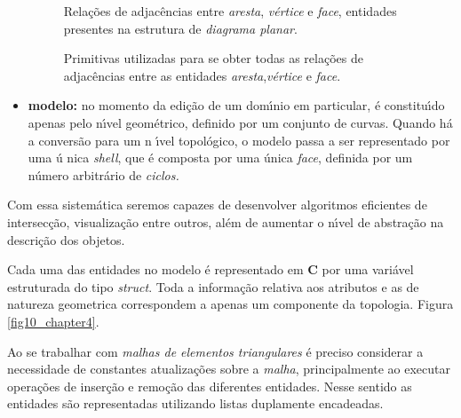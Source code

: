 \documentclass[12pt,a4paper]{book}
\begin{document}
\begin{itemize}
\begin{figure}[htbp]
  \begin{center}
    \leavevmode
    
    \caption{Rela\c{c}\~{o}es de adjac\^{e}ncias entre {\textit{aresta}}, {\textit{v\'{e}rtice}} e {\textit{face}},
	              entidades presentes na estrutura de {\textit{diagrama planar}}.  }   
    \label{fig8_chapter4}
  \end{center}
\end{figure}

\begin{figure}[htbp]
  \begin{center}
    \leavevmode
    
    \caption{Primitivas utilizadas para se obter todas as rela\c{c}\~{o}es de adjac\^{e}ncias
	              entre as entidades {\textit{aresta}},{\textit{v\'{e}rtice}} e {\textit{face}}.}   
    \label{fig9_chapter4}
  \end{center}
\end{figure}


\item \textbf{modelo:} no momento da edi\c{c}\~{a}o de um dom\'{\i}nio em
particular, \'{e} constitu\'{\i}do apenas pelo n\'{\i}vel geom\'{e}trico,
definido por um conjunto de curvas. Quando h\'{a} a convers\~{a}o para um n%
\'{\i}vel topol\'{o}gico, o modelo passa a ser representado por uma \'{u}%
nica \textit{shell}, que \'{e} composta por uma \'{u}nica \textit{face},
definida por um n\'{u}mero arbitr\'{a}rio de \textit{ciclos.}
\end{itemize}

Com essa sistem\'{a}tica seremos capazes de desenvolver algoritmos
eficientes de intersec\c{c}\~{a}o, visualiza\c{c}\~{a}o entre outros, al\'{e}m de aumentar o n\'{\i}vel de abstra\c{c}\~{a}o na descri\c{c}\~{a}o dos
objetos.

Cada uma das entidades no modelo \'{e} representado em \textbf{C} por uma
vari\'{a}vel estruturada do tipo \textit{struct}. Toda a informa\c{c}\~{a}o
relativa aos atributos e as de natureza geometrica correspondem a apenas um
componente da topologia. Figura \ref{fig10_chapter4}.

Ao se trabalhar com \textit{malhas de elementos triangulares} \'{e}
preciso considerar a necessidade de constantes atualiza\c{c}\~{o}es sobre a 
\textit{malha}, principalmente ao executar opera\c{c}\~{o}es de inser\c{c}\~{a}o e 
remo\c{c}\~{a}o das diferentes entidades. Nesse sentido as entidades
s\~{a}o representadas utilizando listas duplamente encadeadas.
\end{document}
